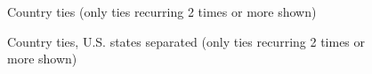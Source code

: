 \documentclass[a4paper]{article}
\begin{document}
\clearpage

\begin{figure}[p]
\caption{Country ties (only ties recurring 2 times or more shown)}
\end{figure}

\clearpage

\begin{figure}[p]
\caption{Country ties, U.S. states separated (only ties recurring 2 times or more shown)}
\end{figure}
\end{document}
